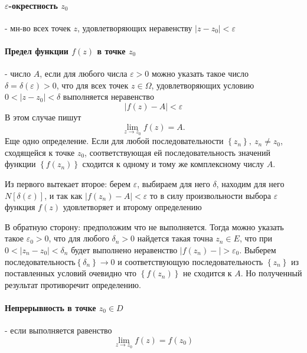 \documentclass[12pt]{extarticle}
\begin{document}
\paragraph{$\varepsilon$-окрестность $z_{0}$}
 -
мн-во всех точек $z$, удовлетворяющих
неравенству $\left|z-z_{0}\right|<\varepsilon$

\paragraph{Предел функции $f(z)$ в точке $z_{0}$} -
число $A$, если для любого числа $\varepsilon>0$ можно указать такое
число $\delta=\delta(\varepsilon)>0$, что для всех точек
$z\in\Omega$, удовлетворяющих условию
$0<\left|z-z_{0}\right|<\delta$ выполняется неравенство
\begin{displaymath}
    \left|f(z)-A\right|<\varepsilon
\end{displaymath}
В этом случае пишут
\begin{displaymath}
    \lim\limits_{z\rightarrow z_{0}}f(z)=A.
\end{displaymath}
Еще одно определение. Если для любой последовательности
$\left\{z_{n}\right\},\ z_{n}\neq z_{0}$, сходящейся к точке
$z_{0}$, соответствующая ей последовательность значений функции
$\left\{f(z_{n})\right\}$ сходится к одному и тому же комплексному
числу $A$.
\par Из первого вытекает второе: берем $\varepsilon$, выбираем для него
$\delta$, находим для него $N[\delta(\varepsilon)]$, и так как
$|f(z_{n})-A|<\varepsilon$ то в силу произвольности выбора $\varepsilon$
функция $f(z)$ удовлетворяет и второму определению
\par В обратную сторону: предположим что не выполняется. Тогда можно
указать такое $\varepsilon_{0}>0$, что для любого $\delta_{n}>0$
найдется такая точна $z_{n}\in E$, что при $0 <
|z_{n}-z_{0}|<\delta_{n}$ будет выполнено неравенство
$|f(z_{n})-|>\varepsilon_{0}$. Выберем
последовательность$\left\{\delta_{n}\right\} \to 0$ и соответствующую
последовательность $\left\{z_{n}\right\}$ из поставленных условий
очевидно что $\left\{f(z_{n})\right\}$ не сходится к $A$. Но полученный
результат противоречит определению.

\paragraph{Непрерывность в точке $z_{0}\in D$} -
если выполняется равенство
\begin{displaymath}
    \lim\limits_{z\rightarrow z_{0}}f(z)=f(z_{0})
\end{displaymath}
\end{document}
